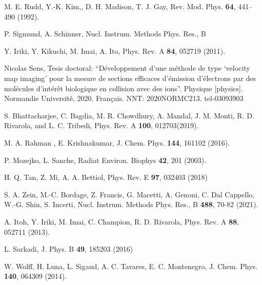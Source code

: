 \begin{thebibliography}{9}
M. E. Rudd, Y.-K. Kim,, D. H. Madison, T. J. Gay,
Rev. Mod. Phys. \textbf{64}, 441--490 (1992).

P. Sigmund, A. Schinner,
Nucl. Instrum. Methods Phys. Res., B \textbf{}

Y. Iriki, Y. Kikuchi, M. Imai, A. Ito,
Phys. Rev. A \textbf{84}, 052719 (2011).

Nicolas Sens, Tesis doctoral:
``Développement d’une méthode de type `velocity map imaging' pour la 
mesure de sections efficaces d’émission d’électrons par des molécules 
d’intérêt biologique en collision avec des ions''. 
Physique [physics]. Normandie Université, 2020. Français. 
NNT: 2020NORMC213. tel-03093903

S. Bhattacharjee, C. Bagdia, M. R. Chowdhury, A. Mandal, J. M. Monti, 
R. D. Rivarola, and L. C. Tribedi, 
Phys. Rev. A \textbf{100}, 012703(2019).

M. A. Rahman , E. Krishnakumar,
J. Chem. Phys. \textbf{144}, 161102 (2016).

P. Mozejko, L. Sanche, 
Radiat Environ. Biophys \textbf{42}, 201 (2003).

H. Q. Tan, Z. Mi, A. A. Bettiol, 
Phys. Rev. E \textbf{97}, 032403 (2018)

S. A. Zein, M.-C. Bordage, Z. Francis, G. Macetti, A. Genoni, 
C. Dal Cappello, W.-G. Shin, S. Incerti,
Nucl. Instrum. Methods Phys. Res., B \textbf{488}, 70-82 (2021).

A. Itoh, Y. Iriki, M. Imai, C. Champion, R. D. Rivarola, 
Phys. Rev. A \textbf{88}, 052711 (2013).

L. Sarkadi, 
J. Phys. B \textbf{49}, 185203 (2016)

W. Wolff, H. Luna, L. Sigaud, A. C. Tavares, E. C. Montenegro,
J. Chem. Phys. \textbf{140}, 064309 (2014).


\end{thebibliography}
